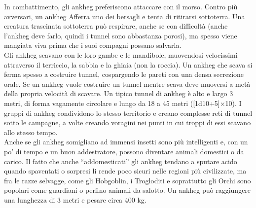 \begin{multicols}{2}
In combattimento, gli ankheg preferiscono attaccare con il morso. Contro più avversari, un ankheg Afferra uno dei bersagli e tenta di ritirarsi sottoterra. Una creatura trascinata sottoterra può respirare, anche se con difficoltà (anche l'ankheg deve farlo, quindi i tunnel sono abbastanza porosi), ma spesso viene mangiata viva prima che i suoi compagni possano salvarla.\\
Gli ankheg scavano con le loro gambe e le mandibole, muovendosi velocissimi attraverso il terriccio, la sabbia e la ghiaia (non la roccia). Un ankheg che scava si ferma spesso a costruire tunnel, cospargendo le pareti con una densa secrezione orale. Se un ankheg vuole costruire un tunnel mentre scava deve muoversi a metà della propria velocità di scavare. Un tipico tunnel di ankheg è alto e largo 3 metri, di forma vagamente circolare e lungo da 18 a 45 metri ([1d10+5]×10). I gruppi di ankheg condividono lo stesso territorio e creano complesse reti di tunnel sotto le campagne, a volte creando voragini nei punti in cui troppi di essi scavano allo stesso tempo.\\
Anche se gli ankheg somigliano ad immensi insetti sono più intelligenti e, con un po’ di tempo e un buon addestratore, possono diventare animali domestici o da carico. Il fatto che anche “addomesticati” gli ankheg tendano a sputare acido quando spaventati o sorpresi li rende poco sicuri nelle regioni più civilizzate, ma fra le razze selvagge, come gli Hobgoblin, i Trogloditi e soprattutto gli Orchi sono popolari come guardiani o perfino animali da salotto. Un ankheg può raggiungere una lunghezza di 3 metri e pesare circa 400 kg.\\


\end{multicols}
